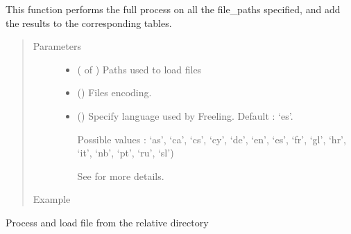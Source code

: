 \documentclass[letterpaper,10pt,english]{sphinxmanual}
\begin{document}
\begin{fulllineitems}
\label{\detokenize{process:loacore.process.file_process.add_files}}
This function performs the full process on all the file\_paths specified, and add the results to the corresponding
tables.
\begin{quote}\begin{description}
\item[{Parameters}] \leavevmode\begin{itemize}
\item {} 
 ( of ) \textendash{} Paths used to load files

\item {} 
 () \textendash{} Files encoding.

\item {} 
 () \textendash{} 
Specify language used by Freeling. Default : ‘es’.

Possible values : ‘as’, ‘ca’, ‘cs’, ‘cy’, ‘de’, ‘en’, ‘es’, ‘fr’, ‘gl’, ‘hr’, ‘it’, ‘nb’, ‘pt’, ‘ru’, ‘sl’)

See  for more details.


\end{itemize}

\item[{Example}] \leavevmode
\end{description}\end{quote}

Process and load file from the relative directory 

%
\begin{sphinxVerbatim}[commandchars=\\\{\}]
  \PYG{p}{[}\PYG{p}{]}
      
       
         


\end{sphinxVerbatim}
\end{fulllineitems}
\end{document}
